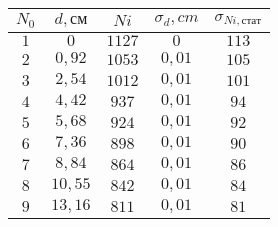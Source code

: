 \begin{tabular}{| c | c | c | c | c |}
\hline
$N_0$ & $d, см$ & $Ni$ & $\sigma_d, cm$ & $\sigma_{Ni, стат}$\\
\hline
$1$ & $0$ & $1127$ & $0$ & $113$\\
\hline
$2$ & $0,92$ & $1053$ & $0,01$ & $105$\\
\hline
$3$ & $2,54$ & $1012$ & $0,01$ & $101$\\
\hline
$4$ & $4,42$ & $937$ & $0,01$ & $94$\\
\hline
$5$ & $5,68$ & $924$ & $0,01$ & $92$\\
\hline
$6$ & $7,36$ & $898$ & $0,01$ & $90$\\
\hline
$7$ & $8,84$ & $864$ & $0,01$ & $86$\\
\hline
$8$ & $10,55$ & $842$ & $0,01$ & $84$\\
\hline
$9$ & $13,16$ & $811$ & $0,01$ & $81$\\
\hline
\end{tabular}
